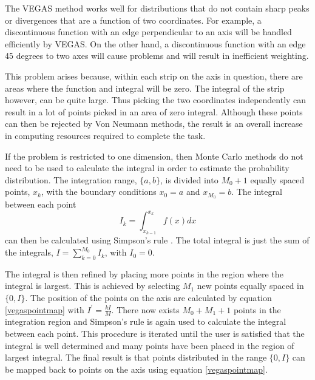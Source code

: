 The VEGAS method works well for distributions that do not contain sharp peaks or divergences that are a function of two coordinates. For example, a discontinuous function with an edge perpendicular to an axis will be handled efficiently by VEGAS. On the other hand, a discontinuous function with an edge 45 degrees to two axes will cause problems and will result in inefficient weighting. 

This problem arises because, within each strip on the axis in question, there are areas where the function and integral will be zero. The integral of the strip however, can be quite large. Thus picking the two coordinates independently can result in a lot of points picked in an area of zero integral. Although these points can then be rejected by Von Neumann methods, the result is an overall increase in computing resources required to complete the task.

If the problem is restricted to one dimension, then Monte Carlo methods do not need to be used to calculate the integral in order to estimate the probability distribution. The integration range, $\{a,b\}$, is divided into $M_0+1$ equally spaced points, $x_k$, with the boundary conditions $x_0 =a$ and $x_{M_0}=b$. The integral between each point 
\begin{equation}\label{intjames}
I_k = \int_{x_{k-1}}^{x_{k}} f(x) dx
\end{equation}
can then be calculated using Simpson's rule \cite{Langanke:1993qn}. The total integral is just the sum of the integrals, $I=\sum_{k=0}^{M_0} I_k$, with $I_0=0$.

The integral is then refined by placing more points in the region where the integral is largest. This is achieved by selecting $M_1$ new points equally spaced in $\{0,I\}$. The position of the points on the axis are calculated by equation \ref{vegaspointmap} with $I^{\prime} = \frac{kI}{M}$. There now exists $M_0 + M_1 + 1$ points in the integration region and Simpson's rule is again used to calculate the integral between each point. This procedure is iterated until the user is satisfied that the integral is well determined and many points have been placed in the region of largest integral. The final result is that points distributed in the range $\{0, I\}$ can be mapped back to points on the axis using equation \ref{vegaspointmap}.






